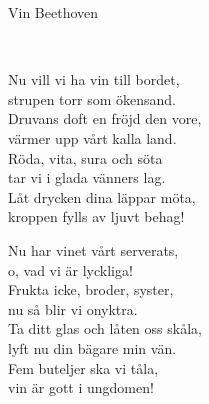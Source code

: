 \begin{song}{Vin Beethoven}
	
	
	\\
	
	Nu vill vi ha vin till bordet,\\
	strupen torr som ökensand.\\
	Druvans doft en fröjd den vore,\\
	värmer upp vårt kalla land.\\
	Röda, vita, sura och söta\\
	tar vi i glada vänners lag.\\
	Låt drycken dina läppar möta,\\
	kroppen fylls av ljuvt behag!
	
	Nu har vinet vårt serverats,\\
	o, vad vi är lyckliga!\\
	Frukta icke, broder, syster,\\
	nu så blir vi onyktra.\\
	Ta ditt glas och låten oss skåla,\\
	lyft nu din bägare min vän.\\
	Fem buteljer ska vi tåla,\\
	vin är gott i ungdomen!
	
\end{song}
